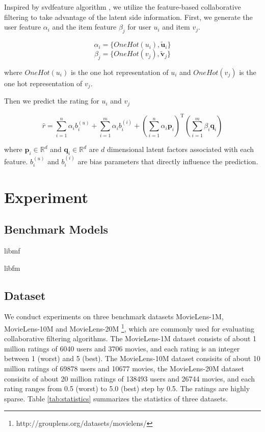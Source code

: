 \documentclass{sig-alternate-05-2015}
\begin{document}
Inspired by svdfeature algorithm \cite{chen2012svdfeature}, we utilize the feature-based
collaborative filtering to take advantage of the latent side information.
First, we generate the user feature $\alpha_{i}$ and the item feature $\beta_{j}$
for user $u_i$ and item $v_j$.

\begin{equation}
\alpha_{i} = \{ OneHot(u_i), \tilde{\mathbf{u}}_i \}
\end{equation}
\begin{equation}
\beta_{j} = \{OneHot(v_j), \tilde{\mathbf{v}}_j \}
\end{equation}

where $OneHot(u_i)$ is the one hot representation of $u_i$
and $OneHot(v_j)$ is the one hot representation of $v_j$.

Then we predict the rating for $u_i$ and $v_j$

\begin{equation}
\hat{r} = \sum_{i=1}^{n} \alpha_{i} b_{i}^{(u)} + \sum_{i=1}^{m} \alpha_{i} b_{i}^{(i)} +
\left( \sum_{i=1}^{n} \alpha_{i} \textbf{p}_{i} \right) ^ \mathrm{T}
\left( \sum_{i=1}^{m} \beta_{i} \textbf{q}_{i} \right)
\end{equation}

where $\textbf{p}_{i} \in \mathbb{R}^d$ and $\textbf{q}_{i} \in \mathbb{R}^d$
are $d$ dimensional latent factors associated with each feature.
$b_{i}^{(u)}$ and $b_{i}^{(i)}$ are bias parameters that directly influence the prediction.


\section{Experiment}

\subsection{Benchmark Models}
libmf \cite{chin2015fast}

libfm \cite{rendle2012factorization}

\subsection{Dataset}
We conduct experiments on three benchmark datasets MovieLens-1M, MovieLens-10M and MovieLens-20M
\footnote{http://grouplens.org/datasets/movielens/},
which are commonly used for evaluating collaborative filtering algorithms.
The MovieLens-1M dataset consists of about 1 million ratings of 6040 users and 3706 movies,
and each rating is an integer between 1 (worst) and 5 (best).
The MovieLens-10M dataset consisits of about 10 million ratings of 69878 users and 10677 movies,
the MovieLens-20M dataset consisits of about 20 million ratings of 138493 users and 26744 movies,
and each rating ranges from 0.5 (worst) to 5.0 (best) step by 0.5.
The ratings are highly sparse.
Table \ref{tab:statistics} summarizes the statistics of three datasets.
\end{document}
